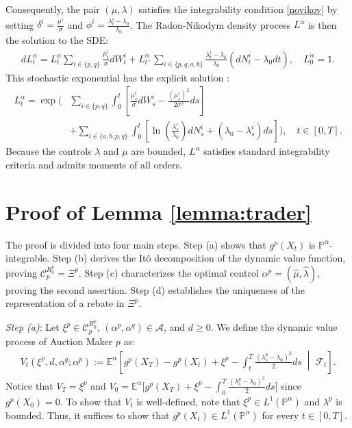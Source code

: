 \documentclass[12pt]{article}
\begin{document}
Consequently, the pair $(\mu, \lambda)$ satisfies the integrability condition \eqref{novikov} by setting $\delta^i = \frac{\mu^i}{\sigma}$ and $\phi^i = \frac{\lambda^i_t - \lambda_0}{\lambda_0}$. The Radon-Nikodym density process $L^\alpha$ is then the solution to the SDE:
\begin{align*}
    dL_t^{\alpha} = L_t^{\alpha}\sum_{i \in \{p,q\}} \frac{\mu_t^i}{\sigma}dW_t^i + L_{t^-}^{\alpha}\sum_{i \in \{p,q,a,b\}} \frac{\lambda^i_t - \lambda_0}{\lambda_0} (dN_t^i - \lambda_0 dt), \quad L^\alpha_0 = 1.
\end{align*}
This stochastic exponential has the explicit solution \cite[Theorem 11.6.10]{shreve2004stochastic}:
\begin{align*}
    L_t^{\alpha} = \exp \Bigg( &\sum_{i \in \{p,q\}} \int_0^t \left[ \frac{\mu_s^i}{\sigma} dW^i_s - \frac{(\mu_s^i)^2}{2\sigma^2}ds \right] \\
    &+ \sum_{i \in \{a,b,p,q\}} \int_0^t \left[ \ln\left(\frac{\lambda^i_s}{\lambda_0}\right) dN_s^i + (\lambda_0 - \lambda^i_s)ds \right] \Bigg), \quad t \in [0,T].
\end{align*}
Because the controls $\lambda$ and $\mu$ are bounded, $L^\alpha$ satisfies standard integrability criteria and admits moments of all orders.

\section{Proof of Lemma \ref{lemma:trader}}\label{app:bestreact} 
The proof is divided into four main steps. Step (a) shows that $g^p(X_t)$ is $\mathbb{P}^\alpha$-integrable. Step (b) derives the Itô decomposition of the dynamic value function, proving $\mathcal{C}^{R_0^p}_p = \Xi^p$. Step (c) characterizes the optimal control $\alpha^p = (\hat{\mu}, \hat{\lambda})$, proving the second assertion. Step (d) establishes the uniqueness of the representation of a rebate in $\Xi^p$. 

\textit{Step (a)}: Let $\xi^p \in \mathcal{C}^{R_0^p}_p$, $(\alpha^p,\alpha^{q}) \in \mathcal{A}$, and $d \geq 0$. We define the dynamic value process of Auction Maker $p$ as:
\begin{align*}
    V_t(\xi^p,d,\alpha^{q}; \alpha^p) := \mathbb{E}^{\alpha} \left[ g^p(X_T) - g^p(X_t) + \xi^p - \int_t^T \frac{(\lambda^p_s - \lambda_0 )^2}{2} ds \;\middle|\; \mathcal{F}_t \right].
\end{align*} 
Notice that $V_T = \xi^p$ and $V_0 = \mathbb{E}^{\alpha} \big[ g^p(X_T) + \xi^p - \int_0^T \frac{(\lambda^p_s - \lambda_0 )^2}{2} ds \big]$ since $g^p(X_0)=0$. To show that $V_t$ is well-defined, note that $\xi^p \in L^1(\mathbb{P}^{\alpha})$ and $\lambda^p$ is bounded. Thus, it suffices to show that $g^p(X_t) \in L^1(\mathbb{P}^{\alpha})$ for every $t \in [0,T]$. 
\end{document}
